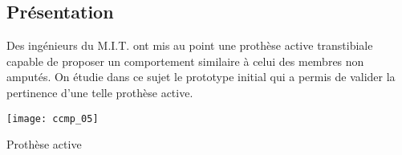 \normaltrue \difficilefalse \tdifficilefalse
\correctiontrue




\setcounter{question}{0}%
\ifcorrection
\else
{}
\fi




\subsection*{Présentation}

\ifprof
\else
Des ingénieurs du M.I.T. ont mis au point une prothèse active transtibiale capable de proposer un comportement
similaire à celui des membres non amputés. On étudie dans ce sujet le prototype initial
qui a permis de valider la pertinence d'une telle prothèse active.


\begin{marginfigure}
\texttt{[image: ccmp\_05]}
\caption{Prothèse active}
\end{marginfigure}



